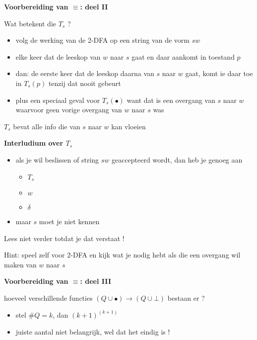 \documentclass{seminar}
\begin{document}
\begin{slide}

{\bf Voorbereiding van $\equiv$: deel II}

Wat betekent die $T_s$ ?

\begin{itemize}
\item 
volg de werking van de 2-DFA op een string van de vorm $sw$

\item 
elke keer dat de leeskop van $w$ naar $s$ gaat en daar aankomt in
toestand $p$

\item 
dan: de eerste keer dat de leeskop daarna van $s$ naar $w$ gaat, komt
ie daar toe in $T_s(p)$ tenzij dat nooit gebeurt

\item
plus een speciaal geval voor $T_s(\bullet)$ want dat is een overgang van
$s$ naar $w$ waarvoor geen vorige overgang van $w$ naar $s$ was

\end{itemize}

$T_s$ bevat alle info die van $s$ naar $w$ kan vloeien


\end{slide} 

\begin{slide}
{\bf Interludium over $T_s$}

\begin{itemize}
\item 
als je wil beslissen of string $sw$ geaccepteerd wordt, dan heb je
genoeg aan
\begin{itemize}
\item 
$T_s$
\item 
$w$
\item 
$\delta$
\end{itemize}


\item maar $s$ moet je niet kennen

\end{itemize}

Lees niet verder totdat je dat verstaat !

Hint: speel zelf voor 2-DFA en kijk wat je nodig hebt als die een
overgang wil maken van $w$ naar $s$

\end{slide} 

\begin{slide}

{\bf Voorbereiding van $\equiv$: deel III}

hoeveel verschillende functies $(Q \cup {\bullet}) \rightarrow (Q \cup {\bot})$ bestaan er ?

\begin{itemize}
\item 
stel $\#Q = k$, dan $(k+1)^{(k+1)}$

\item 
juiste aantal niet belangrijk, wel dat het eindig is !

\end{itemize}


\end{slide} 
\end{document}
